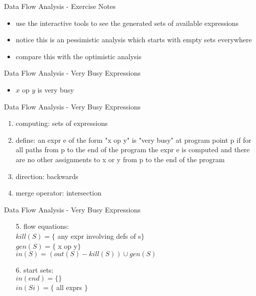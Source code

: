 \documentclass[mcgill,slideColor,colorBG,pdf]{prosper}
\begin{document}
\begin{slide} {Data Flow Analysis - Exercise Notes}
\begin{itemize}
\item use the interactive tools to see the generated sets of available expressions 
\item notice this is an pessimistic analysis which starts with empty sets everywhere
\item compare this with the optimistic analysis
\end{itemize}
\end{slide}

\begin{slide} {Data Flow Analysis - Very Busy Expressions}
\begin{center}\end{center}
\begin{itemize}
\item $x$ op $y$ is very busy
\end{itemize}
\end{slide}

\begin{slide} {Data Flow Analysis - Very Busy Expressions}
\begin{enumerate}
\item computing: sets of expressions
\item define: an expr e of the form "x op y" is "very busy" at program point p if for all paths from p to the end of the program the expr e is computed and there are no other assignments to x or y from p to the end of the program
\item direction: backwards
\item merge operator: intersection
\end{enumerate}
\end{slide}

\begin{slide} {Data Flow Analysis - Very Busy Expressions}
\begin{itemize}
\item[5.] flow equations:\\
$kill(S) = \{$ any expr involving defs of s$\}$\\
$gen(S) = \{$ x op y$\}$\\
$in(S) = (out(S) - kill(S)) \cup gen(S)$\\
\item[6.] start sets:\\
$in(end) = \{\}$\\
$in(Si) = \{$ all exprs $\}$
\end{itemize}
\end{slide}
\end{document}

